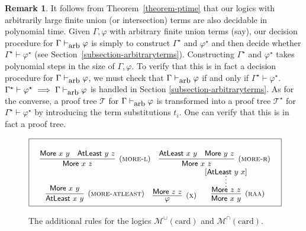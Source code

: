 \documentclass[letterpaper]{article} %
\theoremstyle{definition}
\newtheorem{remark}[theorem]{Remark}
\newcommand{\proves}{\vdash}
\newcommand{\Munion}{\mathscr{M}^{\cup}}
\newcommand{\Minter}{\mathscr{M}^{\cap}}
\newcommand{\proverule}{\textsc}
\newcommand{\morel}{\proverule{more-l}}
\newcommand{\morer}{\proverule{more-r}}
\newcommand{\moreatleast}{\proverule{more-atleast}}
\newcommand{\x}{\proverule{x}}
\newcommand{\raa}{\proverule{raa}}
\newcommand{\Atleast}[2]{\mathsf{AtLeast}\,\,#1\,\,#2}
\newcommand{\More}[2]{\mathsf{More}\,\,#1\,\,#2}
\newcommand{\card}{\mathrm{card}}
\newcommand{\provesarbitrary}{\proves_{\mbox{\small{arb}}}}
\begin{document}
\begin{remark}
It follows from Theorem~\ref{theorem-ptime} that our logics with arbitrarily large finite union (or intersection) terms are also decidable in polynomial time.  
Given $\Gamma, \varphi$ with arbitrary finite union terms (say), our decision procedure for $\Gamma \provesarbitrary \varphi$ is simply to construct $\Gamma^\star$ and $\varphi^\star$ and then decide whether $\Gamma^\star \proves \varphi^\star$ (see Section~\ref{subsection-arbitraryterms}).  
Constructing $\Gamma^\star$ and $\varphi^\star$ takes polynomial steps in the size of $\Gamma, \varphi$.  To verify that this is in fact a decision procedure for $\Gamma \provesarbitrary \varphi$, we must check that $\Gamma \provesarbitrary \varphi$ if and only if $\Gamma^\star \proves \varphi^\star$.  $\Gamma^\star \proves \varphi^\star \implies \Gamma \provesarbitrary \varphi$ is handled in Section \ref{subsection-arbitraryterms}.  As for the converse, a proof tree $\mathcal{T}$ for $\Gamma \provesarbitrary \varphi$ is transformed into a proof tree $\mathcal{T}^\star$ for $\Gamma^\star \proves \varphi^\star$ by introducing the term substitutions $t_i$.  One can verify that this is in fact a proof tree.

\label{remark-complexity}
\end{remark}

\begin{figure*}[ht!]
\begin{equation*}
\boxed{
\small
\begin{array}{c}
\begin{array}{ccc}
\\ 
\infer[(\morel)]
    {\More{x}{z}}
    {\More{x}{y} & \Atleast{y}{z}} 
&
\infer[(\morer)]
    {\More{x}{z}}
    {\Atleast{x}{y} & \More{y}{z}}
\end{array}
\\%
\begin{array}{ccc}
\infer[(\moreatleast)]
    {\Atleast{x}{y}}
    {\More{x}{y}}
&
\infer[(\x)]
    {\varphi}
    {\More{z}{z}}
&
\infer[(\raa)]
     {\More{x}{y}}
     {\inferLineSkip=0pt
     \infer*
        {\More{z}{z}}
        {[\Atleast{y}{x}]}}
\end{array}
\\
\end{array}
}
\end{equation*}
\caption{The additional rules for the logics $\Munion(\card)$ and $\Minter(\card)$.
\label{fig-more-rules}}
\end{figure*}
\end{document}
